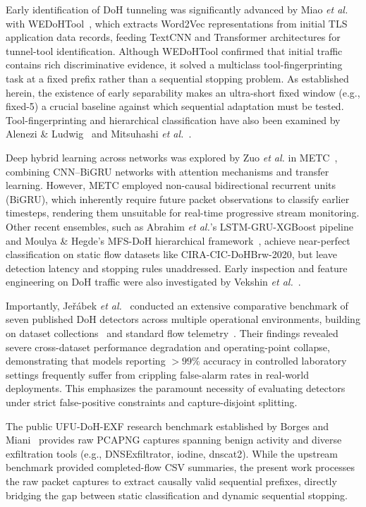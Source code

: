 \documentclass[conference]{IEEEtran}
\begin{document}
Early identification of DoH tunneling was significantly advanced by Miao \emph{et al.} with WEDoHTool~\cite{wedoh}, which extracts Word2Vec representations from initial TLS application data records, feeding TextCNN and Transformer architectures for tunnel-tool identification. Although WEDoHTool confirmed that initial traffic contains rich discriminative evidence, it solved a multiclass tool-fingerprinting task at a fixed prefix rather than a sequential stopping problem. As established herein, the existence of early separability makes an ultra-short fixed window (e.g., fixed-5) a crucial baseline against which sequential adaptation must be tested. Tool-fingerprinting and hierarchical classification have also been examined by Alenezi \& Ludwig~\cite{alenezi2021} and Mitsuhashi \emph{et al.}~\cite{mitsuhashi2021,mitsuhashi2023}.

Deep hybrid learning across networks was explored by Zuo \emph{et al.} in METC~\cite{metc}, combining CNN--BiGRU networks with attention mechanisms and transfer learning. However, METC employed non-causal bidirectional recurrent units (BiGRU), which inherently require future packet observations to classify earlier timesteps, rendering them unsuitable for real-time progressive stream monitoring. Other recent ensembles, such as Abrahim \emph{et al.}'s LSTM-GRU-XGBoost pipeline~\cite{abrahim2026} and Moulya \& Hegde's MFS-DoH hierarchical framework~\cite{moulya2026}, achieve near-perfect classification on static flow datasets like CIRA-CIC-DoHBrw-2020, but leave detection latency and stopping rules unaddressed. Early inspection and feature engineering on DoH traffic were also investigated by Vekshin \emph{et al.}~\cite{vekshin2020}.

Importantly, Je\v{r}\'abek \emph{et al.}~\cite{jerabek} conducted an extensive comparative benchmark of seven published DoH detectors across multiple operational environments, building on dataset collections~\cite{jerabek2022} and standard flow telemetry~\cite{jerabek2023}. Their findings revealed severe cross-dataset performance degradation and operating-point collapse, demonstrating that models reporting $>99\%$ accuracy in controlled laboratory settings frequently suffer from crippling false-alarm rates in real-world deployments. This emphasizes the paramount necessity of evaluating detectors under strict false-positive constraints and capture-disjoint splitting.

The public UFU-DoH-EXF research benchmark established by Borges and Miani~\cite{ufu} provides raw PCAPNG captures spanning benign activity and diverse exfiltration tools (e.g., DNSExfiltrator, iodine, dnscat2). While the upstream benchmark provided completed-flow CSV summaries, the present work processes the raw packet captures to extract causally valid sequential prefixes, directly bridging the gap between static classification and dynamic sequential stopping.
\end{document}
